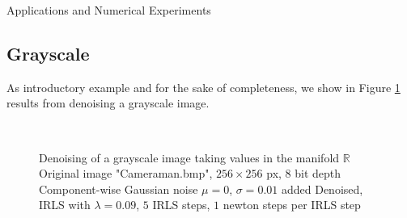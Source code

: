 \begin{chapter}{Applications and Numerical Experiments}
\subsection{Grayscale} %
As introductory example  and for the sake of completeness, we show in Figure \ref{fig:application_gray} results from denoising a grayscale image.
\label{sub:Grayscale}
\begin{figure}[h!]
    \centering
    \\
    \caption[Color image "Cameraman" grayscale denoising]{Denoising of a grayscale image taking values in the manifold $\mathbb{R}$
	 Original image "Cameraman.bmp", $256\times 256$ px, 8 bit depth
	 Component-wise Gaussian noise $\mu=0$, $\sigma=0.01$ added
	 Denoised, IRLS with $\lambda=0.09$, $5$ IRLS steps, $1$ newton steps per IRLS step
	\label{fig:application_gray}
    }
\end{figure}


\end{chapter}
